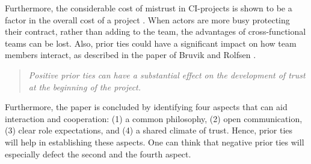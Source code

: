 Furthermore, the considerable cost of mistrust in CI-projects is shown to be a factor in the overall cost of a project \cite{zaghloul2003construction}. When actors are more busy protecting their contract, rather than adding to the team, the advantages of cross-functional teams can be lost.  Also, prior ties could have a significant impact on how team members interact, as described in the paper of Bruvik and Rolfsen \cite{rolfsen}. 
\begin{quote}
    \textit{Positive prior ties can have a substantial effect on the development of trust at the beginning of the project.}
\end{quote}
Furthermore, the paper is concluded by identifying four aspects that can aid interaction and cooperation: (1) a common philosophy, (2) open communication, (3) clear role expectations, and (4) a shared climate of trust. Hence, prior ties will help in establishing these aspects. One can think that negative prior ties will especially defect the second and the fourth aspect. 

\cleardoublepage